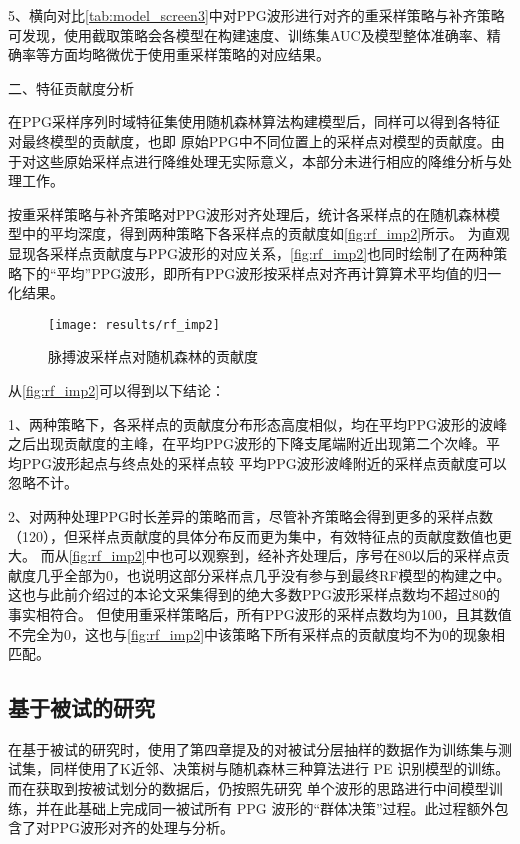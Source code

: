 5、横向对比\autoref{tab:model_screen3}中对PPG波形进行对齐的重采样策略与补齐策略可发现，使用截取策略会各模型在构建速度、训练集AUC及模型整体准确率、精确率等方面均略微优于使用重采样策略的对应结果。

二、特征贡献度分析

在PPG采样序列时域特征集使用随机森林算法构建模型后，同样可以得到各特征对最终模型的贡献度，也即
原始PPG中不同位置上的采样点对模型的贡献度。由于对这些原始采样点进行降维处理无实际意义，本部分未进行相应的降维分析与处理工作。

按重采样策略与补齐策略对PPG波形对齐处理后，统计各采样点的在随机森林模型中的平均深度，得到两种策略下各采样点的贡献度如\autoref{fig:rf_imp2}所示。
为直观显现各采样点贡献度与PPG波形的对应关系，\autoref{fig:rf_imp2}也同时绘制了在两种策略下的“平均”PPG波形，即所有PPG波形按采样点对齐再计算算术平均值的归一化结果。

\begin{figure}[htbp]
      \centering
      \texttt{[image: results/rf\_imp2]}
      \caption{\label{fig:rf_imp2}脉搏波采样点对随机森林的贡献度}
\end{figure}

从\autoref{fig:rf_imp2}可以得到以下结论：

1、两种策略下，各采样点的贡献度分布形态高度相似，均在平均PPG波形的波峰之后出现贡献度的主峰，在平均PPG波形的下降支尾端附近出现第二个次峰。平均PPG波形起点与终点处的采样点较
平均PPG波形波峰附近的采样点贡献度可以忽略不计。

2、对两种处理PPG时长差异的策略而言，尽管补齐策略会得到更多的采样点数（120），但采样点贡献度的具体分布反而更为集中，有效特征点的贡献度数值也更大。
而从\autoref{fig:rf_imp2}中也可以观察到，经补齐处理后，序号在80以后的采样点贡献度几乎全部为0，也说明这部分采样点几乎没有参与到最终RF模型的构建之中。
这也与此前介绍过的本论文采集得到的绝大多数PPG波形采样点数均不超过80的事实相符合。
但使用重采样策略后，所有PPG波形的采样点数均为100，且其数值不完全为0，这也与\autoref{fig:rf_imp2}中该策略下所有采样点的贡献度均不为0的现象相匹配。

\subsection{基于被试的研究}
在基于被试的研究时，使用了第四章提及的对被试分层抽样的数据作为训练集与测试集，同样使用了K近邻、决策树与随机森林三种算法进行 PE 识别模型的训练。
而在获取到按被试划分的数据后，仍按照先研究
单个波形的思路进行中间模型训练，并在此基础上完成同一被试所有 PPG 波形的“群体决策”过程。此过程额外包含了对PPG波形对齐的处理与分析。

